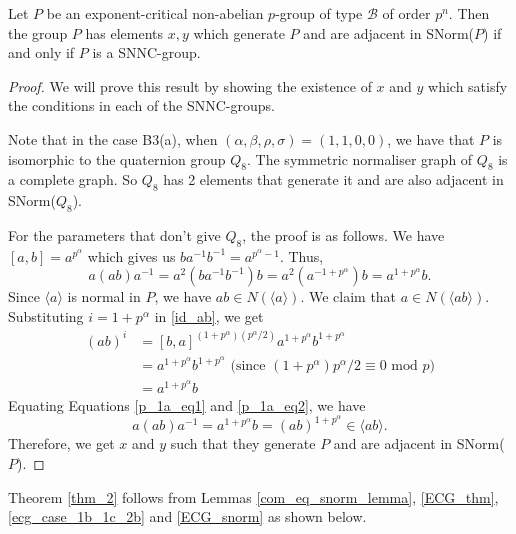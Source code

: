 \begin{lemma}\label{ECG_snorm}
    Let $P$ be an exponent-critical non-abelian $p$-group of type $\mathcal{B}$ of order $p^n$. Then the group $P$ has elements $x,y$ which generate $P$ and are adjacent in SNorm($P$) if and only if $P$ is a SNNC-group.
\end{lemma}
\begin{proof}
We will prove this result by showing the existence of $x$ and $y$ which satisfy the conditions in each of the SNNC-groups.
    
 Note that in the case B3(a), when $(\alpha, \beta, \rho, \sigma) = (1, 1, 0, 0)$, we have that $P$ is isomorphic to the quaternion group $Q_8$. The symmetric normaliser graph of $Q_8$ is a complete graph. So $Q_8$ has 2 elements that generate it and are also adjacent in SNorm($Q_8$).
    
For the parameters that don't give $Q_8$, the proof is as follows. We have $ [a,b] = a^{p^\alpha}$ which gives us $ba^{-1}b^{-1}=a^{p^{\alpha}-1}$. Thus, 
    \begin{equation}\label{p_1a_eq1}
      a(ab)a^{-1} = a^2(ba^{-1}b^{-1})b = a^2(a^{-1+p^{\alpha}})b=a^{1+p^{\alpha}}b.
    \end{equation}
Since $\langle a \rangle$ is normal in $P$, we have $ab \in N(\langle a \rangle)$. We claim that $a \in N(\langle ab \rangle)$. Substituting $i=1+p^{\alpha}$ in \ref{id_ab}, we get
    \begin{equation}\label{p_1a_eq2}
        \begin{split}
            (ab)^i &= [b,a]^{(1+p^{\alpha})(p^{\alpha}/2)}a^{1+p^{\alpha}}b^{1+p^{\alpha}}\\
            &= a^{1+p^{\alpha}}b^{1+p^{\alpha}} \text{ (since } (1+p^{\alpha})p^{\alpha}/2 \equiv 0  \text{ mod } p \text{)}\\ 
            &= a^{1+p^{\alpha}}b
        \end{split}
    \end{equation}
    Equating Equations \ref{p_1a_eq1} and \ref{p_1a_eq2}, we have $$a(ab)a^{-1} = a^{1+p^{\alpha}}b = (ab)^{1+p^{\alpha}} \in \langle ab \rangle.$$Therefore, we get $x$ and $y$ such that they generate $P$ and are adjacent in SNorm($P$).
\end{proof}

Theorem \ref{thm_2} follows from Lemmas \ref{com_eq_snorm_lemma}, \ref{ECG_thm}, \ref{ecg_case_1b_1c_2b} and \ref{ECG_snorm} as shown below.


